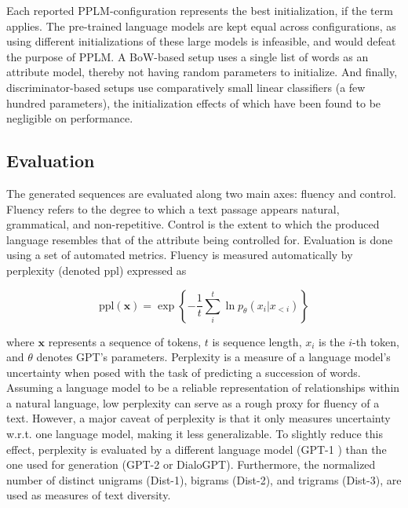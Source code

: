 Each reported PPLM-configuration represents the best initialization, if the term applies. The pre-trained language models are kept equal across configurations, as using different initializations of these large models is infeasible, and would defeat the purpose of PPLM. A BoW-based setup uses a single list of words as an attribute model, thereby not having random parameters to initialize. And finally, discriminator-based setups use comparatively small linear classifiers (a few hundred parameters), the initialization effects of which have been found to be negligible on performance.

\subsection{Evaluation}\label{subsec:exp_setup_eval}

The generated sequences are evaluated along two main axes: fluency and control. Fluency refers to the degree to which a text passage appears natural, grammatical, and non-repetitive. Control is the extent to which the produced language resembles that of the attribute being controlled for. Evaluation is done using a set of automated metrics. Fluency is measured automatically by perplexity (denoted ppl) 
expressed as

\begin{equation}
    \text{ppl}(\textbf{x}) = \exp \left\{ - \frac{1}{t} \sum_{i}^t \ln p_{\theta}(x_i | x_{<i})\right\}    
\end{equation}

where $\textbf{x}$ represents a sequence of tokens, $t$ is sequence length, $x_i$ is the $i$-th token, and $\theta$ denotes GPT's parameters. Perplexity is a measure of a language model's uncertainty when posed with the task of predicting a succession of words. Assuming a language model to be a reliable representation of relationships within a natural language, low perplexity can serve as a rough proxy for fluency of a text. However, a major caveat of perplexity is that it only measures uncertainty w.r.t. one language model, making it less generalizable. To slightly reduce this effect, perplexity is evaluated by a different language model (GPT-1 \citep{radford2018improving}) than the one used for generation (GPT-2 or DialoGPT).
Furthermore, the normalized number of distinct unigrams (Dist-1), bigrams (Dist-2), and trigrams (Dist-3), are used as measures of text diversity. 

